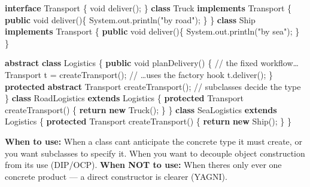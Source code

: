 \documentclass[11pt]{article}
\newenvironment{Shaded}{\begin{snugshade}}{\end{snugshade}}
\newcommand{\BuiltInTok}[1]{\textcolor[rgb]{0.50,0.55,0.55}{#1}}
\newcommand{\CommentTok}[1]{\textcolor[rgb]{0.48,0.49,0.49}{#1}}
\newcommand{\ControlFlowTok}[1]{\textcolor[rgb]{0.99,0.74,0.29}{\textbf{#1}}}
\newcommand{\DataTypeTok}[1]{\textcolor[rgb]{0.16,0.50,0.73}{#1}}
\newcommand{\FunctionTok}[1]{\textcolor[rgb]{0.56,0.27,0.68}{#1}}
\newcommand{\KeywordTok}[1]{\textcolor[rgb]{0.81,0.81,0.76}{\textbf{#1}}}
\newcommand{\NormalTok}[1]{\textcolor[rgb]{0.81,0.81,0.76}{#1}}
\newcommand{\OperatorTok}[1]{\textcolor[rgb]{0.81,0.81,0.76}{#1}}
\newcommand{\StringTok}[1]{\textcolor[rgb]{0.96,0.31,0.31}{#1}}
\begin{document}

\begin{Shaded}
\begin{Highlighting}[]
\KeywordTok{interface}\NormalTok{ Transport }\OperatorTok{\{} \DataTypeTok{void} \FunctionTok{deliver}\OperatorTok{();} \OperatorTok{\}}
\KeywordTok{class}\NormalTok{ Truck }\KeywordTok{implements}\NormalTok{ Transport }\OperatorTok{\{} \KeywordTok{public} \DataTypeTok{void} \FunctionTok{deliver}\OperatorTok{()\{} \BuiltInTok{System}\OperatorTok{.}\FunctionTok{out}\OperatorTok{.}\FunctionTok{println}\OperatorTok{(}\StringTok{"by road"}\OperatorTok{);} \OperatorTok{\}} \OperatorTok{\}}
\KeywordTok{class}\NormalTok{ Ship  }\KeywordTok{implements}\NormalTok{ Transport }\OperatorTok{\{} \KeywordTok{public} \DataTypeTok{void} \FunctionTok{deliver}\OperatorTok{()\{} \BuiltInTok{System}\OperatorTok{.}\FunctionTok{out}\OperatorTok{.}\FunctionTok{println}\OperatorTok{(}\StringTok{"by sea"}\OperatorTok{);} \OperatorTok{\}} \OperatorTok{\}}

\KeywordTok{abstract} \KeywordTok{class}\NormalTok{ Logistics }\OperatorTok{\{}
    \KeywordTok{public} \DataTypeTok{void} \FunctionTok{planDelivery}\OperatorTok{()} \OperatorTok{\{}           \CommentTok{// the fixed workflow…}
\NormalTok{        Transport t }\OperatorTok{=} \FunctionTok{createTransport}\OperatorTok{();}   \CommentTok{// …uses the factory hook}
\NormalTok{        t}\OperatorTok{.}\FunctionTok{deliver}\OperatorTok{();}
    \OperatorTok{\}}
    \KeywordTok{protected} \KeywordTok{abstract}\NormalTok{ Transport }\FunctionTok{createTransport}\OperatorTok{();}   \CommentTok{// subclasses decide the type}
\OperatorTok{\}}
\KeywordTok{class}\NormalTok{ RoadLogistics }\KeywordTok{extends}\NormalTok{ Logistics }\OperatorTok{\{}
    \KeywordTok{protected}\NormalTok{ Transport }\FunctionTok{createTransport}\OperatorTok{()} \OperatorTok{\{} \ControlFlowTok{return} \KeywordTok{new} \FunctionTok{Truck}\OperatorTok{();} \OperatorTok{\}}
\OperatorTok{\}}
\KeywordTok{class}\NormalTok{ SeaLogistics }\KeywordTok{extends}\NormalTok{ Logistics }\OperatorTok{\{}
    \KeywordTok{protected}\NormalTok{ Transport }\FunctionTok{createTransport}\OperatorTok{()} \OperatorTok{\{} \ControlFlowTok{return} \KeywordTok{new} \FunctionTok{Ship}\OperatorTok{();} \OperatorTok{\}}
\OperatorTok{\}}
\end{Highlighting}
\end{Shaded}

\textbf{When to use:} When a class can\textquotesingle t anticipate the concrete type it must create, or you want subclasses to specify it. When you want to decouple object construction from its use (DIP/OCP). \textbf{When NOT to use:} When there\textquotesingle s only ever one concrete product --- a direct constructor is clearer (YAGNI).
\end{document}
